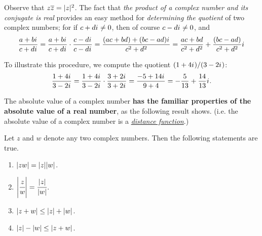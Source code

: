 \begin{remark} \label{remark d.5}
Observe that \(z\overline{z} = \lvert z\rvert^2\).
The fact that \emph{the product of a complex number and its conjugate is real} provides an easy method for \emph{determining the quotient} of two complex numbers;
for if \(c + d{i\mkern1mu} \ne 0\), then of course \(c - d{i\mkern1mu} \ne 0\), and
\[
    \frac{a + b{i\mkern1mu}}{c + d{i\mkern1mu}} = \frac{a + b{i\mkern1mu}}{c + d{i\mkern1mu}} \cdot \frac{c - d{i\mkern1mu}}{c - d{i\mkern1mu}} = \frac{(ac + bd) + (bc - ad){i\mkern1mu}}{c^2 + d^2} = \frac{ac + bd}{c^2 + d^2} + \frac{(bc - ad)}{c^2 + d^2}{i\mkern1mu}
\]
\end{remark}

\begin{example} \label{example d.4}
To illustrate this procedure, we compute the quotient \((1 + 4{i\mkern1mu})/(3 - 2{i\mkern1mu})\):
\[
    \frac{1 + 4{i\mkern1mu}}{3 - 2{i\mkern1mu}} = \frac{1 + 4{i\mkern1mu}}{3 - 2{i\mkern1mu}} \cdot \frac{3 + 2{i\mkern1mu}}{3 + 2{i\mkern1mu}} = \frac{-5 + 14{i\mkern1mu}}{9 + 4} = -\frac{5}{13} + \frac{14}{13}{i\mkern1mu}.
\]
\end{example}

The absolute value of a complex number \textbf{has the familiar properties of the absolute value of a real number}, as the following result shows.
(i.e. the absolute value of a complex number is a \emph{\href{https://www.wikiwand.com/en/Metric_(mathematics)}{distance function}}.)

\begin{appendix theorem} \label{thm d.3}
Let \(z\) and \(w\) denote any two complex numbers.
Then the following statements are true.
\begin{enumerate}
\item \(\lvert zw\rvert = \lvert z\rvert \lvert w\rvert\).
\item \(\left| \cfrac{z}{w} \right| = \cfrac{\lvert z\rvert}{\lvert w\rvert}\).
\item \(\lvert z + w\rvert \le \lvert z\rvert + \lvert w\rvert\).
\item \(\lvert z\rvert - \lvert w\rvert \le \lvert z + w\rvert\).
\end{enumerate}
\end{appendix theorem}

